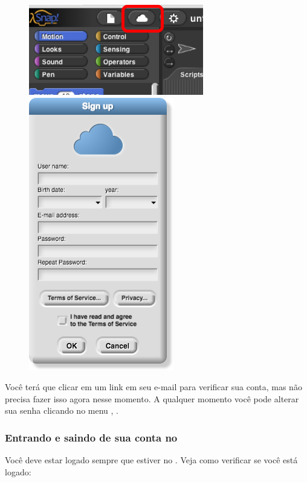 \begin{figure}[H]
\centering
\includegraphics[scale=0.5]{imagens/button-cloud-with-context.png}
\hspace{4cm}
\includegraphics[scale=0.35]{imagens/dialog-cloud-signup.png}
\end{figure}

Você terá que clicar em um link em seu e-mail para verificar sua conta, mas não
precisa fazer isso agora nesse momento. A qualquer momento você pode alterar sua
senha clicando no menu ,
.

\subsubsection{Entrando e saindo de sua conta no \snap}
\label{cap:un1-lab1-01-b}

Você deve estar logado sempre que estiver no \snap. Veja como verificar se você
está logado:

